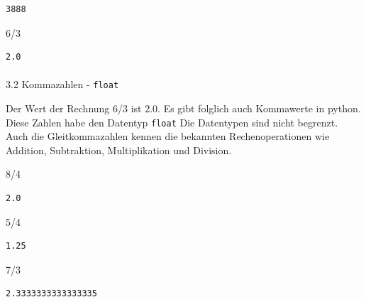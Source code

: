 \documentclass[
  11pt,
  a4paper,
  DIV=11,
  numbers=noendperiod]{scrartcl}
\makeatletter
\let\oldparagraph\paragraph
\renewcommand{\paragraph}{
    \@ifstar
      \xxxParagraphStar
      \xxxParagraphNoStar
  }
\newcommand{\xxxParagraphStar}[1]{\oldparagraph*{#1}\mbox{}}
\newcommand{\xxxParagraphNoStar}[1]{\oldparagraph{#1}\mbox{}}
\newenvironment{Shaded}{\begin{snugshade}}{\end{snugshade}}
\newcommand{\DecValTok}[1]{\textcolor[rgb]{0.68,0.00,0.00}{#1}}
\newcommand{\OperatorTok}[1]{\textcolor[rgb]{0.37,0.37,0.37}{#1}}
\makeatother
\begin{document}
\begin{verbatim}
3888
\end{verbatim}

\begin{Shaded}
\begin{Highlighting}[numbers=left,,]
\DecValTok{6}\OperatorTok{/}\DecValTok{3}
\end{Highlighting}
\end{Shaded}

\begin{verbatim}
2.0
\end{verbatim}

\paragraph{\texorpdfstring{3.2 Kommazahlen -
\texttt{float}}{3.2 Kommazahlen - float}}\label{kommazahlen---float}

Der Wert der Rechnung 6/3 ist 2.0. Es gibt folglich auch Kommawerte in
python. Diese Zahlen habe den Datentyp \texttt{float} Die Datentypen
sind nicht begrenzt. Auch die Gleitkommazahlen kennen die bekannten
Rechenoperationen wie Addition, Subtraktion, Multiplikation und
Division.

\begin{Shaded}
\begin{Highlighting}[numbers=left,,]
\DecValTok{8}\OperatorTok{/}\DecValTok{4}
\end{Highlighting}
\end{Shaded}

\begin{verbatim}
2.0
\end{verbatim}

\begin{Shaded}
\begin{Highlighting}[numbers=left,,]
\DecValTok{5}\OperatorTok{/}\DecValTok{4}
\end{Highlighting}
\end{Shaded}

\begin{verbatim}
1.25
\end{verbatim}

\begin{Shaded}
\begin{Highlighting}[numbers=left,,]
\DecValTok{7}\OperatorTok{/}\DecValTok{3}
\end{Highlighting}
\end{Shaded}

\begin{verbatim}
2.3333333333333335
\end{verbatim}
\end{document}
